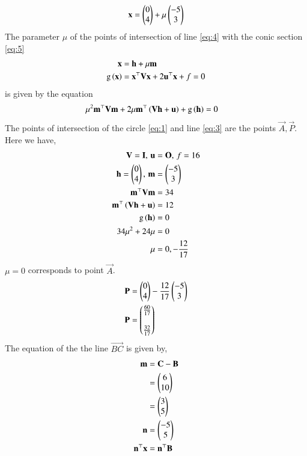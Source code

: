 \documentclass[journal,12pt,twocolumn]{IEEEtran}
\begin{document}
\begin{enumerate}
\begin{align}
\mathbf{x} = \begin{pmatrix}0\\4\end{pmatrix} + \mu \begin{pmatrix}-5\\3\end{pmatrix}
\end{align}
The parameter $\mu$ of the points of intersection of line \eqref{eq:4} with the conic section \eqref{eq:5}
\begin{align}
\mathbf{x} &= \mathbf{h} + \mu \mathbf{m}
\label{eq:4}\\
\text{g}\left(\mathbf{x}\right) &= \mathbf{x}^{\top}\mathbf{V}\mathbf{x}+2\mathbf{u}^{\top}\mathbf{x}+f=0
\label{eq:5}
\end{align}
is given by the equation 
\begin{align}
\mu^2\mathbf{m}^{\top}\mathbf{V}\mathbf{m} + 2 \mu\mathbf{m}^{\top}\left(\mathbf{V}\mathbf{h}+\mathbf{u}\right) + \text{g}\left(\mathbf{h}\right) &=0
\label{eq:6}
\end{align}
The points of intersection of the circle \eqref{eq:1} and line \eqref{eq:3} are the points $\vec{A}, \vec{P}$. Here we have,
\begin{align}
\mathbf{V} = \mathbf{I}, \, \mathbf{u} &= \mathbf{O}, \, f = 16\\
\mathbf{h} = \begin{pmatrix}0\\4\end{pmatrix}, \, \mathbf{m} &= \begin{pmatrix}-5\\3\end{pmatrix}\\
\mathbf{m}^{\top}\mathbf{V}\mathbf{m} &= 34\\
\mathbf{m}^{\top}\left(\mathbf{V}\mathbf{h}+\mathbf{u}\right) &= 12\\
\text{g}\left(\mathbf{h}\right) &= 0\\
34\mu^2 + 24 \mu &= 0\\
\mu &= 0, -\frac{12}{17}
\end{align}
$\mu = 0$ corresponds to point $\vec{A}$.
\begin{align}
\mathbf{P} &= \begin{pmatrix}0\\4\end{pmatrix} -\frac{12}{17} \begin{pmatrix}-5\\3\end{pmatrix}\\
\mathbf{P} &= \begin{pmatrix}\frac{60}{17}\\\\\frac{32}{17}\end{pmatrix}
\end{align}
The equation of the the line $\vec{BC}$ is given by,
\begin{align}
\vec{m} &= \vec{C}-\vec{B}\\
&= \myvec{6\\10}\\
&= \myvec{3\\5}\\
\vec{n} &= \myvec{-5\\5}\\
\vec{n}^\top\vec{x} &= \vec{n}^\top\vec{B}

\end{align}
\end{enumerate}
\end{document}

